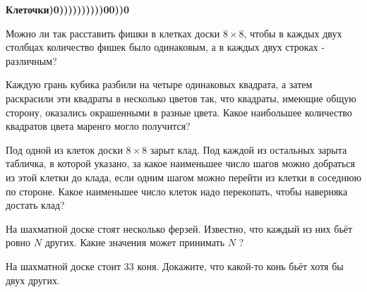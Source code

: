 \centerline{\bf \Huge Клеточки)0))))))))))00))0}

\begin{flushright}
        \scriptsize{}
\end{flushright}


Можно ли так расставить фишки в клетках доски $8 \times 8$, чтобы в каждых двух столбцах количество фишек было одинаковым, а в каждых двух строках - различным?

Каждую грань кубика разбили на четыре одинаковых квадрата, а затем раскрасили эти квадраты в несколько цветов так, что квадраты, имеющие общую сторону, оказались окрашенными в разные цвета. Какое наибольшее количество квадратов цвета маренго могло получится?

Под одной из клеток доски $8 \times 8$ зарыт клад. Под каждой из остальных зарыта табличка, в которой указано, за какое наименьшее число шагов можно добраться из этой клетки до клада, если одним шагом можно перейти из клетки в соседнюю по стороне. Какое наименьшее число клеток надо перекопать, чтобы наверняка достать клад?

На шахматной доске стоят несколько ферзей. Известно, что каждый из них бьёт ровно $N$ других. Какие значения может принимать $N$ ?

На шахматной доске стоит 33 коня. Докажите, что какой-то конь бьёт хотя бы двух других.